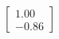\documentclass[preview]{standalone}
\begin{document}
\begin{align*}
\begin{bmatrix} 1.00 \\ -0.86 \end{bmatrix}
\end{align*}
\end{document}
